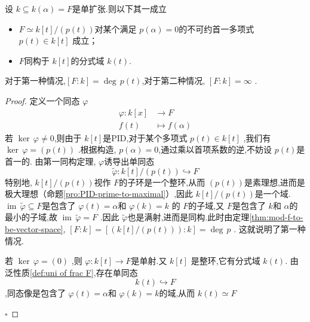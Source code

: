 \documentclass[lang=cn,12pt,color=green,fontset=none,pad]{elegantbook}
\begin{document}
\begin{proposition}\label{pro:simple-extension-pro}
    设 \(  k\subseteq k\left( \alpha  \right)=F   \)是单扩张.则以下其一成立
    \begin{itemize}
        \item \(  F\simeq k[t]/\left( p\left( t \right)  \right)   \)对某个满足 \(  p\left(  \alpha  \right)=0   \)的不可约首一多项式 \(  p\left( t \right) \in k[t]   \)   成立；
        \item  \(  F  \)同构于 \(  k[t]  \)的分式域 \(  k\left( t \right)   \).                             
    \end{itemize}
    对于第一种情况,\(  [F:k ]= \operatorname{deg}\,p\left( t \right)   \),对于第二种情况, \(  [F:k]=\infty  \)  .
\end{proposition}

\begin{proof}
    定义一个同态 \(  \varphi   \) \[
    \begin{aligned}
    \varphi : k[x]& \to F\\ 
     f\left( t \right) &\mapsto f\left( \alpha  \right)  
    \end{aligned}
    \] 若 \(  \operatorname{ker}\,\varphi \neq 0  \),则由于 \(  k[t]  \)是PID,对于某个多项式 \(  p\left( t \right) \in k[t]   \)   ,我们有 \(  \operatorname{ker}\,\varphi = \left( p\left( t \right)  \right)    \) .根据构造, \(  p\left(  \alpha  \right)=0   \),通过乘以首项系数的逆,不妨设 \(  p\left( t \right)   \)是首一的.
    由第一同构定理, \(  \varphi   \)诱导出单同态 \[
    \tilde{\varphi}: k[t]/\left( p\left( t \right)  \right) \hookrightarrow F 
    \]   特别地, \(  k[t]/ \left( p\left( t \right)  \right)   \)视作 \(  F  \)的子环是一个整环,从而 \(  \left( p\left( t \right)  \right)   \)是素理想,进而是极大理想（命题\ref{pro:PID-prime-to-maximal}）,因此 \(  k[t]/\left( p\left( t \right)  \right)   \)是一个域.
    \(  \operatorname{im}\,\tilde{\varphi}\subseteq F  \)是包含了 \(  \varphi\left( t \right)=\alpha   \)和 \(  \varphi\left( k\right)=k   \) 的 \(  F  \)的子域,又 \(  F  \)是包含了 \(  k  \)和 \(  \alpha  \)的最小的子域,故 \(  \operatorname{im}\,\tilde{\varphi}=F  \)  .因此 \(  \tilde{\varphi}  \)也是满射,进而是同构.此时由定理\ref{thm:mod-f-to-be-vector-space}, \(  [F:k]=[\left( k[t]/\left( p\left( t \right)  \right)\right) :k  ] =\operatorname{deg}\,p \) .
    这就说明了第一种情况.

    若 \(  \operatorname{ker}\,\varphi=\left( 0 \right)   \) ,则 \(  \varphi:k[t]\to F  \)是单射.又 \(  k[t]  \) 是整环,它有分式域 \(  k\left( t \right)    \).
    由泛性质\ref{def:uni of frac F},存在单同态 \[
    k\left( t \right)\hookrightarrow F 
    \],同态像是包含了 \(  \varphi\left( t \right)=\alpha   \)和 \(  \varphi\left( k \right)=k   \)的域,从而 \(  k\left( t \right)\simeq F   \)   

    \hfill $\square$
\end{proof}
    
\end{document}
